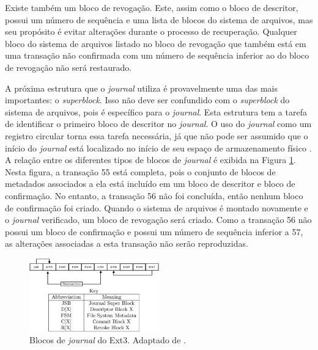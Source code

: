 \documentclass[
	12pt,				%
	openright,			%
	oneside,			%
	a4paper,			%
	chapter=TITLE,		%
	english,			%
	french,				%
	spanish,			%
	brazil				%
	]{abntex2}
\theoremstyle{definition}
\begin{document}
Existe também um bloco de revogação. Este, assim como o bloco de descritor, possui um 
número de sequência e uma lista de blocos do sistema de arquivos, mas seu propósito é 
evitar alterações durante o processo de recuperação. Qualquer bloco do sistema de arquivos 
listado no bloco de revogação que também está em uma transação não confirmada com um número 
de sequência inferior ao do bloco de revogação não será restaurado.

A próxima estrutura que o \textit{journal} utiliza é provavelmente uma das mais 
importantes: o \textit{superblock}. Isso não deve ser confundido com o 
\textit{superblock} do sistema de arquivos, pois é específico para o \textit{journal}. 
Esta estrutura tem a tarefa de identificar o primeiro bloco de descritor no \textit{journal}. 
O uso do \textit{journal} como um registro circular torna essa tarefa necessária, já 
que não pode ser assumido que o início do \textit{journal} está localizado no início de 
seu espaço de armazenamento físico \cite{carrier2005file}. A relação entre os diferentes 
tipos de blocos de \textit{journal} é exibida na Figura \ref{fig:ext3_joual_blocks}. Nesta figura, a transação 55 
está completa, pois o conjunto de blocos de metadados associados a ela está incluído em 
um bloco de descritor e bloco de confirmação. No entanto, a transação 56 não foi concluída, 
então nenhum bloco de confirmação foi criado. Quando o sistema de arquivos é montado 
novamente e o \textit{journal} verificado, um bloco de revogação será criado. Como a 
transação 56 não possui um bloco de confirmação e possui um número de sequência inferior 
a 57, as alterações associadas a esta transação não serão reproduzidas.

\begin{figure}[h]
    \centering
    \includegraphics[width=0.5\textwidth]{journalingf.jpg}
    \caption{Blocos de \textit{journal} do Ext3. Adaptado de \cite{carrier2005file}.}
    \label{fig:ext3_joual_blocks}
\end{figure}
\end{document}
